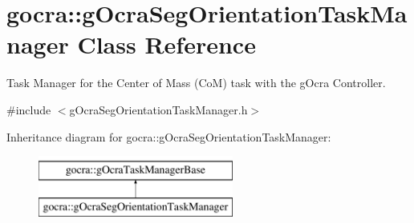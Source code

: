 \hypertarget{classgocra_1_1gOcraSegOrientationTaskManager}{}\section{gocra\+:\+:g\+Ocra\+Seg\+Orientation\+Task\+Manager Class Reference}
\label{classgocra_1_1gOcraSegOrientationTaskManager}


Task Manager for the Center of Mass (CoM) task with the g\+Ocra Controller.  




{\ttfamily \#include $<$g\+Ocra\+Seg\+Orientation\+Task\+Manager.\+h$>$}

Inheritance diagram for gocra\+:\+:g\+Ocra\+Seg\+Orientation\+Task\+Manager\+:\begin{figure}[H]
\begin{center}
\leavevmode
\includegraphics[height=2.000000cm]{db/d04/classgocra_1_1gOcraSegOrientationTaskManager}
\end{center}
\end{figure}
